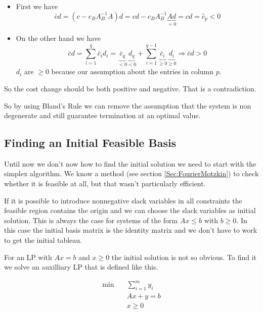 \begin{pr}
\begin{itemize}
\item First we have 
\[\bar cd = (c - c_B A_B^{-1} A) d= cd - c_B A_B^{-1}\underbrace{Ad}_{=0} = cd = \hat c_p<0\]

\item On the other hand we have
\[\bar c d = \sum_{i=1}^{q} \bar c_i d_i = \underbrace{\bar c_q}_{<0}\underbrace{d_q}_{<0} + \sum _{i=1}^{q-1} \underbrace{\bar c_i}_{\geq 0}\underbrace{d_i}_{\geq 0} \Rightarrow \bar c d >0\]
$d_i$ are $\geq 0$ because our assumption about the entries in column $p$. %

\end{itemize}

So the cost change should be both positive and negative. That is a contradiction.
\end{pr}

So by using Bland's Rule we can remove the assumption that the system is non degenerate and still guarantee termination at an optimal value.

\subsection{Finding an Initial Feasible Basis}

Until now we don't now how to find the initial solution we need to start with the simplex algorithm. We know a method (see section \ref{Sec:FourierMotzkin}) to check whether it is feasible at all, but that wasn't particularly efficient. 

If it is possible to introduce nonnegative slack variables in all constraints the feasible region contains the origin and we can choose the slack variables as initial solution. This is always the case for systems of the form $Ax\leq b$ with $b\geq 0$. In this case the initial basis matrix is the identity matrix and we don't have to work to get the initial tableau.

For an LP with $Ax=b$ and $x\geq 0$ the initial solution is not so obvious. To find it we solve an auxilliary LP that is defined like this.

\begin{align*}
\min \quad & \sum_{i=1}^m y_i\\
&Ax+y=b\\
&x\geq 0
\end{align*}


